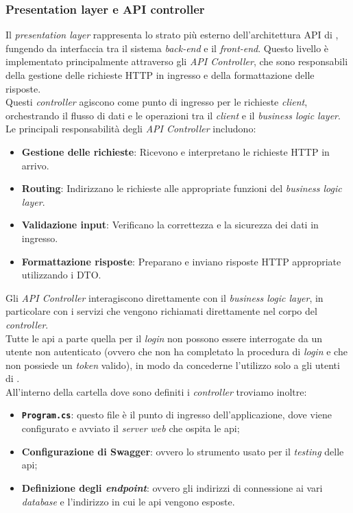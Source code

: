 \subsubsection{Presentation layer e API controller}
Il \textit{presentation layer} rappresenta lo strato più esterno dell'architettura API di {\movi}, fungendo da interfaccia 
tra il sistema \textit{back-end} e il \textit{front-end}. Questo livello è implementato principalmente attraverso gli 
\textit{API Controller}, che sono responsabili della gestione delle richieste HTTP in ingresso e della formattazione 
delle risposte.\\
Questi \textit{controller} agiscono come punto di ingresso per le richieste \textit{client}, orchestrando il flusso 
di dati e le operazioni tra il \textit{client} e il \textit{business logic layer}.\\
Le principali responsabilità degli \textit{API Controller} includono:
\begin{itemize}
    \item \textbf{Gestione delle richieste}: Ricevono e interpretano le richieste HTTP in arrivo.
    \item \textbf{Routing}: Indirizzano le richieste alle appropriate funzioni del \textit{business logic layer}.
    \item \textbf{Validazione input}: Verificano la correttezza e la sicurezza dei dati in ingresso.
    \item \textbf{Formattazione risposte}: Preparano e inviano risposte HTTP appropriate utilizzando i DTO.
\end{itemize}
Gli \textit{API Controller} interagiscono direttamente con il \textit{business logic layer}, in particolare con i 
servizi che vengono richiamati direttamente nel corpo del \textit{controller}.\\
Tutte le \gls{api} a parte quella per il \textit{login} non possono essere interrogate da un utente non autenticato 
(ovvero che non ha completato la procedura di \textit{login} e che non possiede un \textit{token} valido), in modo 
da concederne l'utilizzo solo a gli utenti di {\movi}.\\
All'interno della cartella dove sono definiti i \textit{controller} troviamo inoltre:
\begin{itemize}
    \item \textbf{\texttt{Program.cs}}: questo file è il punto di ingresso dell'applicazione, dove viene configurato e avviato il 
           \textit{server web} che ospita le \gls{api};
    \item \textbf{Configurazione di Swagger}: ovvero lo strumento usato per il \textit{testing} delle \gls{api};
    \item \textbf{Definizione degli \textit{endpoint}}: ovvero gli indirizzi di connessione ai vari \textit{database} 
          e l'indirizzo in cui le \gls{api} vengono esposte.
\end{itemize}
